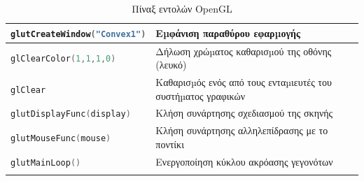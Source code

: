 \begin{center}
\begin{longtable}{p{6.5cm}|p{7cm}}
        \textlatin{\lstinline[language=C]!glutCreateWindow("Convex1")!} & Εµφάνιση παραθύρου εφαρµογής \\ \hline
        \textlatin{\lstinline[language=C]!glClearColor(1,1,1,0)!} & Δήλωση χρώµατος καθαρισµού της οθόνης (λευκό) \\ \hline
        \textlatin{\lstinline[language=C]!glClear!} & Καθαρισµός ενός από τους ενταµιευτές του συστήµατος γραφικών \\ \hline
        \textlatin{\lstinline[language=C]!glutDisplayFunc(display)!} & Κλήση συνάρτησης σχεδιασμού της σκηνής \\ \hline
        \textlatin{\lstinline[language=C]!glutMouseFunc(mouse)!} & Κλήση συνάρτησης αλληλεπίδρασης με το ποντίκι \\ \hline
        \textlatin{\lstinline[language=C]!glutMainLoop()!} & Ενεργοποίηση κύκλου ακρόασης γεγονότων \\ \hline
    \caption{Πίναξ εντολών \textlatin{OpenGL}}
    \end{longtable}
\end{center}
